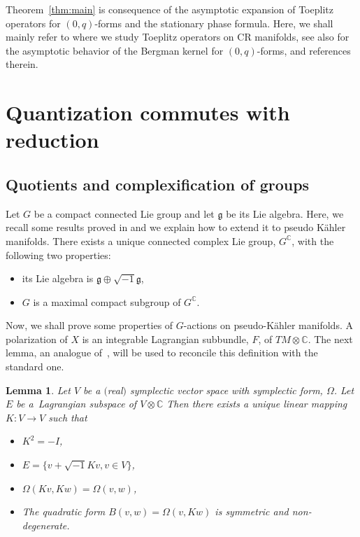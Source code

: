 \documentclass[pdftex]{sigma}
\numberwithin{equation}{section}
\newtheorem{Lemma}[Theorem]{Lemma}
\begin{document}
 	Theorem~\ref{thm:main} is consequence of the asymptotic expansion of Toeplitz operators for $(0,q)$-forms and the stationary phase formula. Here, we shall mainly refer to \cite{gh} where we study Toeplitz operators on CR manifolds, see also \cite{hsiao,mm} for the asymptotic behavior of the Bergman kernel for $(0,q)$-forms, and references therein.
 	
 	\section{Quantization commutes with reduction}
 	\subsection{Quotients and complexification of groups}
 	\label{sec:quot}
 	
 	Let $G$ be a compact connected Lie group and let $\mathfrak{g}$ be its Lie algebra. Here, we recall some results proved in \cite[Section 4]{gs} and we explain how to extend it to pseudo K\"ahler manifolds. There exists a unique connected complex Lie group, $G^{\mathbb{C}}$, with the following two properties:
 	\begin{itemize}\itemsep=0pt
 		\item its Lie algebra is $\mathfrak{g}\oplus \sqrt{-1} \mathfrak{g}$,
 		\item $G$ is a maximal compact subgroup of $G^{\mathbb{C}}$.
 	\end{itemize}

 	Now, we shall prove some properties of $G$-actions on pseudo-K\"ahler manifolds. A polarization of $X$ is an integrable Lagrangian subbundle, $F$, of $TM\otimes \mathbb{C}$. The next lemma, an analogue of~\cite[Lemma 4.3]{gs}, will be used to reconcile this definition with the standard one.
 	
 	\begin{Lemma} \label{lem:gs} Let $V$ be a $($real$)$ symplectic vector space with symplectic form, $\Omega$. Let $E$ be a~Lagrangian subspace of $V\otimes \mathbb{C}$ Then there exists a unique linear mapping $K \colon V \rightarrow V$ such that
 	\begin{itemize}	\itemsep=0pt\samepage
 	\item[$(i)$] $K^2 = -I$,
 	\item[$(ii)$] $E=\big\{v+\sqrt{-1} Kv, v\in V\big\}$,
 	\item[$(iii)$] $\Omega(Kv, Kw)=\Omega(v, w)$,
 	\item[$(iv)$] The quadratic form $B(v, w)= \Omega(v, K w)$ is symmetric and non-degenerate.
 	\end{itemize}
 	\end{Lemma}
 	
\end{document}
